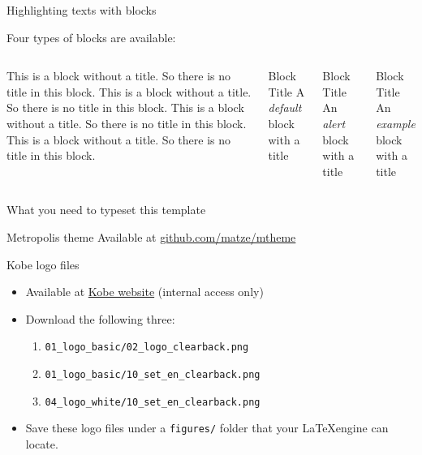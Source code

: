 \documentclass[12pt]{beamer}
\begin{document}
\begin{frame}{Highlighting texts with blocks}

Four types of blocks are available:
\bigskip

\begin{columns}
		\begin{block}{}
		This is a block without a title. So there is no title in this block. This is a block without a title. So there is no title in this block. This is a block without a title. So there is no title in this block. This is a block without a title. So there is no title in this block. 

		\end{block}
		\begin{block}{Block Title}
		A \emph{default} block with a title
		\end{block}

		\begin{alertblock}{Block Title}
		An \emph{alert} block with a title
		\end{alertblock}

		\begin{exampleblock}{Block Title}
		An \emph{example} block with a title
		\end{exampleblock}
\end{columns} 
\end{frame}


\begin{frame}{What you need to typeset this template}

\begin{block}{Metropolis theme}
Available at {\footnotesize \href{https://github.com/matze/mtheme}{github.com/matze/mtheme}}	
\end{block}

\begin{block}{Kobe logo files}
\begin{itemize}
\item Available at \href{https://www.kobe-u.ac.jp/info/outline/resources/download.html}{Kobe website} (internal access only)	
\item Download the following three: 
	\begin{enumerate}
	\item {\footnotesize {\tt 01\_logo\_basic/02\_logo\_clearback.png}}
	\item {\footnotesize {\tt 01\_logo\_basic/10\_set\_en\_clearback.png}}
	\item {\footnotesize {\tt 04\_logo\_white/10\_set\_en\_clearback.png}}
	\end{enumerate}
\item Save these logo files under a {\tt \footnotesize figures/} folder that your \LaTeX \space engine can locate.
\end{itemize}
\end{block}

\end{frame}
\end{document}
